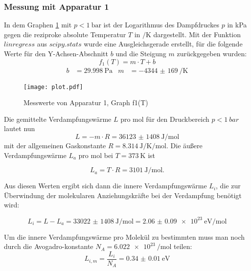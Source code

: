 \subsubsection{Messung mit Apparatur 1}
In dem Graphen \ref{fig:f1(T)} mit $p < \SI{1}{\bar}$
ist der Logarithmus des Dampfdruckes $p$ in \si{\kPa}
gegen die reziproke absolute Temperatur $T$ in $\si{\per\kelvin}$ dargestellt.
Mit der Funktion $linregress$ aus $scipy.stats$
wurde eine Ausgleichsgerade erstellt, für die folgende Werte für den
Y-Achsen-Abschnitt $b$ und die Steigung $m$ zurückgegeben wurden:
\begin{equation}
  f_1(T) = m \cdot T + b
\end{equation}
\begin{align}
  b & = \SI{29.998}{\Pa} &  m & = \SI{-4344(169)}{\per\kelvin}
\end{align}

\newpage

\begin{figure}
  \centering
  \texttt{[image: plot.pdf]}
  \caption{Messwerte von Apparatur 1, Graph f1(T)}
  \label{fig:f1(T)}
\end{figure}

Die gemittelte Verdampfungswärme $L$ pro \si{mol} für den Druckbereich
$p < \SI{1}{bar}$ lautet nun
\begin{equation}
  L = -m \cdot R = \SI{36123(1408)}{\joule\per\mol}
\end{equation}
mit der allgemeinen Gaskonstante\cite{gaskonstante}
$R = \SI{8.314}{\joule\per\kelvin\per\mol}$.
Die äußere Verdampfungswärme $L_a$ pro \si{mol} bei $T = \SI{373}{\kelvin}$ ist

\begin{equation}
  L_a = T \cdot R = \SI{3101}{\joule\per\mol}.
\end{equation}

Aus diesen Werten ergibt sich dann die innere Verdampfungswärme $L_i$, die
zur Überwindung der molekularen Anziehungskräfte bei der Verdampfung benötigt
wird:

\begin{equation}
  L_i = L - L_a = \SI{33022(1408)}{\joule\per\mol} =
  \SI{2.06(9)e23}{\electronvolt\per\mol}
\end{equation}

Um die innere Verdampfungswärme pro Molekül zu bestimmten muss man noch durch
die Avogadro-konstante\cite{avogadro}
$N_A = \SI{6.022 e23}{\per\mol}$ teilen:
\begin{equation}
  L_{i,m} = \frac{L_i}{N_A} = \SI{0.34(1)}{\electronvolt}
\end{equation}

